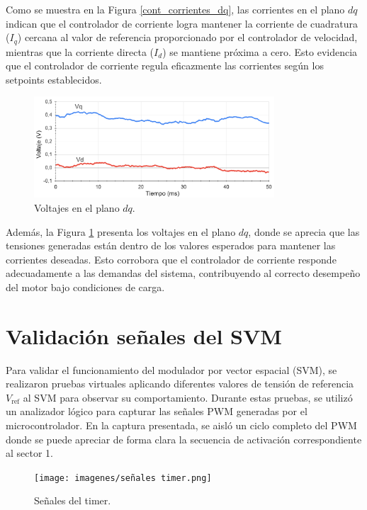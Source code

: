 \documentclass[11pt]{report}
\begin{document}
Como se muestra en la Figura \ref{cont_corrientes_dq}, las corrientes en el plano $dq$ indican que el controlador de corriente logra mantener la corriente de cuadratura ($I_q$) cercana al valor de referencia proporcionado por el controlador de velocidad, mientras que la corriente directa ($I_d$) se mantiene próxima a cero. Esto evidencia que el controlador de corriente regula eficazmente las corrientes según los setpoints establecidos.

\begin{figure}[ht]
	\centering
	\includegraphics[width=0.8\textwidth]{imagenes/CC_DQ.png}
	\caption{Voltajes en el plano $dq$.}
	\label{voltajes_dq}
\end{figure}
\FloatBarrier

Además, la Figura \ref{voltajes_dq} presenta los voltajes en el plano $dq$, donde se aprecia que las tensiones generadas están dentro de los valores esperados para mantener las corrientes deseadas. Esto corrobora que el controlador de corriente responde adecuadamente a las demandas del sistema, contribuyendo al correcto desempeño del motor bajo condiciones de carga.

\newpage
\section{Validación señales del SVM}

Para validar el funcionamiento del modulador por vector espacial (SVM), se realizaron pruebas virtuales aplicando diferentes valores de tensión de referencia $V_{\text{ref}}$ al SVM para observar su comportamiento. Durante estas pruebas, se utilizó un analizador lógico para capturar las señales PWM generadas por el microcontrolador. En la captura presentada, se aisló un ciclo completo del PWM donde se puede apreciar de forma clara la secuencia de activación correspondiente al sector 1.

\begin{figure}[ht]
	\centering
	\texttt{[image: imagenes/señales timer.png]}
	\caption{Señales del timer.}
	\label{señal_timer}
\end{figure}
\FloatBarrier
\end{document}

